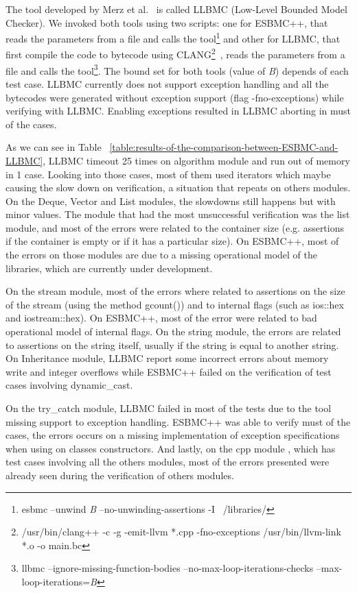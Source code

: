 \documentclass[a4paper]{llncs}
\begin{document}
The tool developed by Merz et al.~\cite{Florian12} is called LLBMC (Low-Level Bounded Model Checker). We invoked both tools using two scripts: one for ESBMC++, that reads the parameters from a file and calls the tool\footnote[1]{esbmc --unwind \textit{B} --no-unwinding-assertions -I ~/libraries/} and other for LLBMC, that first compile the code to bytecode using CLANG\footnote[2]{/usr/bin/clang++ -c -g -emit-llvm *.cpp -fno-exceptions \newline /usr/bin/llvm-link *.o -o main.bc}~\cite{CLANG}, reads the parameters from a file and calls the tool\footnote[3]{llbmc --ignore-missing-function-bodies --no-max-loop-iterations-checks --max-loop-iterations=\textit{B}}. The bound set for both tools (value of \textit{B}) depends of each test case. LLBMC currently does not support exception handling and all the bytecodes were generated without exception support (flag -fno-exceptions) while verifying with LLBMC. Enabling exceptions resulted in LLBMC aborting in must of the cases.

As we can see in Table ~\ref{table:results-of-the-comparison-between-ESBMC-and-LLBMC}, LLBMC timeout 25 times on algorithm module and run out of memory in 1 case. Looking into those cases, most of them used iterators which maybe causing the slow down on verification, a situation that repeats on others modules. On the Deque, Vector and List modules, the slowdowns still happens but with minor values. The module that had the most unsuccessful verification was the list module, and most of the errors were related to the container size (e.g. assertions if the container is empty or if it has a particular size). On ESBMC++, most of the errors on those modules are due to a missing operational model of the libraries, which are currently under development.

On the stream module, most of the errors where related to assertions on the size of the stream (using the method gcount()) and to internal flags (such as ios::hex and iostream::hex). On ESBMC++, most of the error were related to bad operational model of internal flags. On the string module, the errors are related to assertions on the string itself, usually if the string is equal to another string. On Inheritance module, LLBMC report some incorrect errors about memory write and integer overflows while ESBMC++ failed on the verification of test cases involving dynamic\_cast.

On the try\_catch module, LLBMC failed in most of the tests due to the tool missing support to exception handling. ESBMC++ was able to verify must of the cases, the errors occurs on a missing implementation of exception specifications when using on classes constructors. And lastly, on the cpp module , which has test cases involving all the others modules, most of the errors presented were already seen during the verification of others modules.
\end{document}
